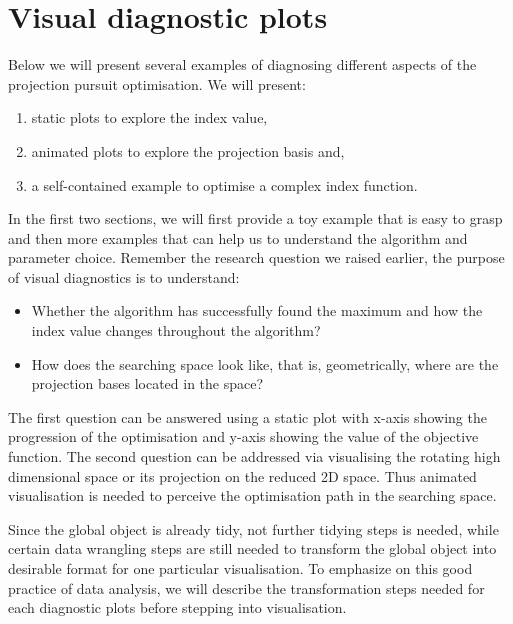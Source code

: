 \documentclass[12pt]{article}
\begin{document}
\hypertarget{vis-diag-plots}{%
\section{Visual diagnostic plots}\label{vis-diag-plots}}

Below we will present several examples of diagnosing different aspects
of the projection pursuit optimisation. We will present:

\begin{enumerate}
\def\labelenumi{\arabic{enumi})}
\item
  static plots to explore the index value,
\item
  animated plots to explore the projection basis and,
\item
  a self-contained example to optimise a complex index function.
\end{enumerate}

In the first two sections, we will first provide a toy example that is
easy to grasp and then more examples that can help us to understand the
algorithm and parameter choice. Remember the research question we raised
earlier, the purpose of visual diagnostics is to understand:

\begin{itemize}
\item
  Whether the algorithm has successfully found the maximum and how the
  index value changes throughout the algorithm?
\item
  How does the searching space look like, that is, geometrically, where
  are the projection bases located in the space?
\end{itemize}

The first question can be answered using a static plot with x-axis
showing the progression of the optimisation and y-axis showing the value
of the objective function. The second question can be addressed via
visualising the rotating high dimensional space or its projection on the
reduced 2D space. Thus animated visualisation is needed to perceive the
optimisation path in the searching space.

Since the global object is already tidy, not further tidying steps is
needed, while certain data wrangling steps
\citep{wickham2016rfordatascience} are still needed to transform the
global object into desirable format for one particular visualisation. To
emphasize on this good practice of data analysis, we will describe the
transformation steps needed for each diagnostic plots before stepping
into visualisation.
\end{document}
